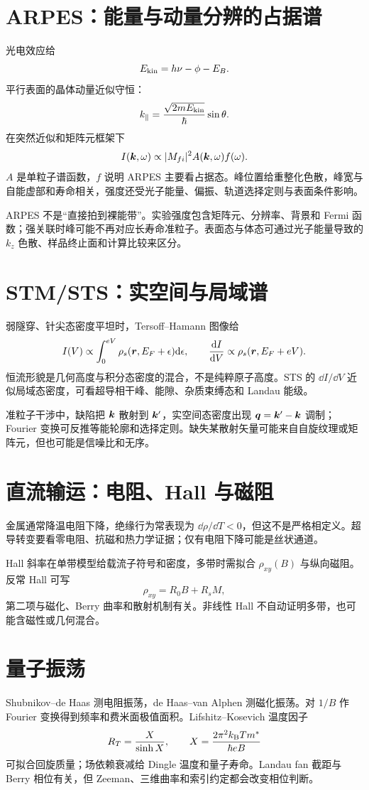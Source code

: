 \section{ARPES：能量与动量分辨的占据谱}
光电效应给
\[
E_{\rm kin}=h\nu-\phi-E_B.
\]
平行表面的晶体动量近似守恒：
\[
k_\parallel=\frac{\sqrt{2mE_{\rm kin}}}{\hbar}\sin\theta.
\]
在突然近似和矩阵元框架下
\[
I(\bm{k},\omega)\propto |M_{fi}|^2
A(\bm{k},\omega)f(\omega).
\]
$A$ 是单粒子谱函数，$f$ 说明 ARPES 主要看占据态。峰位置给重整化色散，峰宽与自能虚部和寿命相关，强度还受光子能量、偏振、轨道选择定则与表面条件影响。

\begin{pitfallbox}
ARPES 不是“直接拍到裸能带”。实验强度包含矩阵元、分辨率、背景和 Fermi 函数；强关联时峰可能不再对应长寿命准粒子。表面态与体态可通过光子能量导致的 $k_z$ 色散、样品终止面和计算比较来区分。
\end{pitfallbox}

\section{STM/STS：实空间与局域谱}
弱隧穿、针尖态密度平坦时，Tersoff--Hamann 图像给
\[
I(V)\propto\int_0^{eV}\rho_s(\bm{r},E_F+\epsilon)\mathrm d\epsilon,
\qquad
\frac{\mathrm d I}{\mathrm d V}\propto\rho_s(\bm{r},E_F+eV).
\]
恒流形貌是几何高度与积分态密度的混合，不是纯粹原子高度。STS 的
$\dd I/\dd V$ 近似局域态密度，可看超导相干峰、能隙、杂质束缚态和 Landau 能级。

准粒子干涉中，缺陷把 $\bm{k}$ 散射到 $\bm{k}'$，实空间态密度出现
$\bm{q}=\bm{k}'-\bm{k}$ 调制；Fourier 变换可反推等能轮廓和选择定则。缺失某散射矢量可能来自自旋纹理或矩阵元，但也可能是信噪比和无序。

\section{直流输运：电阻、Hall 与磁阻}
金属通常降温电阻下降，绝缘行为常表现为 $\dd\rho/\dd T<0$，但这不是严格相定义。超导转变要看零电阻、抗磁和热力学证据；仅有电阻下降可能是丝状通道。

Hall 斜率在单带模型给载流子符号和密度，多带时需拟合
$\rho_{xy}(B)$ 与纵向磁阻。反常 Hall 可写
\[
\rho_{xy}=R_0B+R_sM,
\]
第二项与磁化、Berry 曲率和散射机制有关。非线性 Hall 不自动证明多带，也可能含磁性或几何混合。

\section{量子振荡}
Shubnikov--de Haas 测电阻振荡，de Haas--van Alphen 测磁化振荡。对 $1/B$ 作 Fourier 变换得到频率和费米面极值面积。Lifshitz--Kosevich 温度因子
\[
R_T=\frac{X}{\sinh X},\qquad
X=\frac{2\pi^2k_{\mathrm B} Tm^*}{\hbar eB}
\]
可拟合回旋质量；场依赖衰减给 Dingle 温度和量子寿命。Landau fan 截距与 Berry 相位有关，但 Zeeman、三维曲率和索引约定都会改变相位判断。

